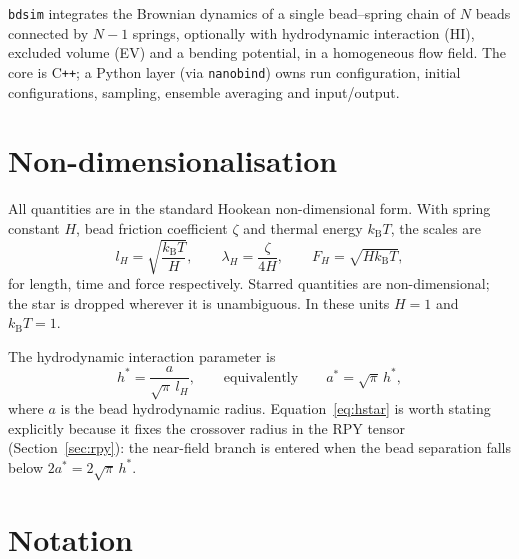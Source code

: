 \documentclass[11pt,a4paper]{report}
\newcommand{\kB}{k_\mathrm{B}}
\newcommand{\code}[1]{\texttt{\seqsplitcode{#1}}}
\newcommand{\seqsplitcode}[1]{#1}
\begin{document}
\code{bdsim} integrates the Brownian dynamics of a single bead--spring chain of
$N$ beads connected by $N-1$ springs, optionally with hydrodynamic interaction
(HI), excluded volume (EV) and a bending potential, in a homogeneous flow field.
The core is C\texttt{++}; a Python layer (via \code{nanobind}) owns run
configuration, initial configurations, sampling, ensemble averaging and
input/output.

\section{Non-dimensionalisation}
\label{sec:units}

All quantities are in the standard Hookean non-dimensional form. With spring
constant $H$, bead friction coefficient $\zeta$ and thermal energy $\kB T$, the
scales are
\begin{equation}
  l_H = \sqrt{\frac{\kB T}{H}}, \qquad
  \lambda_H = \frac{\zeta}{4H}, \qquad
  F_H = \sqrt{H \kB T},
\end{equation}
for length, time and force respectively. Starred quantities are non-dimensional;
the star is dropped wherever it is unambiguous. In these units $H = 1$ and
$\kB T = 1$.

The hydrodynamic interaction parameter is
\begin{equation}
  h^{*} = \frac{a}{\sqrt{\pi}\, l_H},
  \qquad\text{equivalently}\qquad
  a^{*} = \sqrt{\pi}\, h^{*},
  \label{eq:hstar}
\end{equation}
where $a$ is the bead hydrodynamic radius. Equation~\eqref{eq:hstar} is worth
stating explicitly because it fixes the crossover radius in the RPY tensor
(Section~\ref{sec:rpy}): the near-field branch is entered when the bead
separation falls below $2a^{*} = 2\sqrt{\pi}\,h^{*}$.

\section{Notation}
\end{document}
